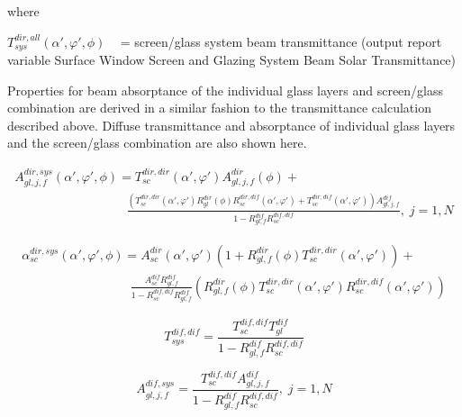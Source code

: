 where

\(T_{sys}^{dir,all}(\alpha ',\varphi ',\phi )\) ~ = screen/glass system beam transmittance (output report variable Surface Window Screen and Glazing System Beam Solar Transmittance)

Properties for beam absorptance of the individual glass layers and screen/glass combination are derived in a similar fashion to the transmittance calculation described above. Diffuse transmittance and absorptance of individual glass layers and the screen/glass combination are also shown here.

\begin{equation}
\begin{array}{l}A_{gl,j,f}^{dir,sys}\left( {\alpha ',\varphi ',\phi } \right) = T_{sc}^{dir,dir}\left( {\alpha ',\varphi '} \right)A_{gl,j,f}^{dir}\left( \phi \right) + \\\;\;\;\;\;\;\;\;\;\;\;\;\;\;\,\,\,\,\,\,\,\,\,\,\,\,\,\,\,\,\,\,\,\,\;\;\;\;\;\;\frac{{\left( {T_{sc}^{dir,dir}\left( {\alpha ',\varphi '} \right)R_{gl}^{dir}\left( \phi \right)R_{sc}^{dir,dif}\left( {\alpha ',\varphi '} \right) + T_{sc}^{dir,dif}\left( {\alpha ',\varphi '} \right)} \right)A_{gl,j,f}^{dif}}}{{1 - R_{gl,f}^{dif}R_{sc}^{dif,dif}}},\;j = 1,N\end{array}
\end{equation}

\begin{equation}
\begin{array}{l}\alpha_{sc}^{dir,sys}\left( {\alpha ',\varphi ',\phi } \right) = A_{sc}^{dir}\left( {\alpha ',\varphi '} \right)\left( {1 + R_{gl,f}^{dir}\left( \phi \right)T_{sc}^{dir,dir}\left( {\alpha ',\varphi '} \right)} \right) + \\\;\;\;\;\;\;\;\;\;\;\;\;\;\;\;\;\;\;\;\;\;\;\;\;\;\;\;\;\;\;\;\frac{{A_{sc}^{dif}R_{gl,f}^{dif}}}{{1 - R_{sc}^{dif,dif}R_{gl,f}^{dif}}}\left( {R_{gl,f}^{dir}\left( \phi \right)T_{sc}^{dir,dir}\left( {\alpha ',\varphi '} \right)R_{sc}^{dir,dif}\left( {\alpha ',\varphi '} \right)} \right)\end{array}
\end{equation}

\begin{equation}
T_{sys}^{dif,dif} = \frac{{T_{sc}^{dif,dif}T_{gl}^{dif}}}{{1 - R_{gl,f}^{dif}R_{sc}^{dif,dif}}}
\end{equation}

\begin{equation}
A_{gl,j,f}^{dif,sys} = \frac{{T_{sc}^{dif,dif}A_{gl,j,f}^{dif}}}{{1 - R_{gl,f}^{dif}R_{sc}^{dif,dif}}},\;j = 1,N
\end{equation}

